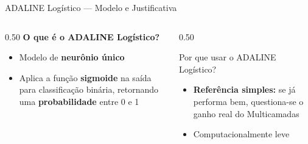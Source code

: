 \documentclass[aspectratio=169,11pt,brazil]{beamer}
\begin{document}
\begin{frame}{ADALINE Logístico — Modelo e Justificativa}
  \begin{columns}[T]
    \begin{column}{0.50\textwidth}
      \textbf{O que é o ADALINE Logístico?}
      \begin{itemize}
        \item Modelo de \textbf{neurônio único}
        \item Aplica a função \textbf{sigmoide} na saída para classificação binária, retornando uma \textbf{probabilidade} entre 0 e 1
      \end{itemize}
    \end{column}
    \begin{column}{0.50\textwidth}
      \begin{block}{Por que usar o ADALINE Logístico?}
        \begin{itemize}
          \item \textbf{Referência simples:} se já performa bem, questiona-se o ganho real do Multicamadas
          \item Computacionalmente leve
        \end{itemize}
      \end{block}

    \end{column}
  \end{columns}
\end{frame}
\end{document}
